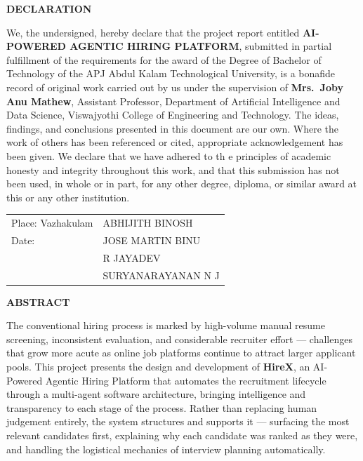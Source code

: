 \documentclass[12pt,a4paper]{report}
\begin{document}
\clearpage
\pagestyle{empty}
\begin{center}
    {\large\bfseries DECLARATION}
\end{center}
\vspace{0.5cm}

\noindent
We, the undersigned, hereby declare that the project report entitled \textbf{AI-POWERED AGENTIC HIRING PLATFORM}, submitted in partial fulfillment of the requirements for the award of the Degree of Bachelor of Technology of the APJ Abdul Kalam Technological University, is a bonafide record of original work carried out by us under the supervision of \textbf{Mrs.\ Joby Anu Mathew}, Assistant Professor, Department of Artificial Intelligence and Data Science, Viswajyothi College of Engineering and Technology. The ideas, findings, and conclusions presented in this document are our own. Where the work of others has been referenced or cited, appropriate acknowledgement has been given. We declare that we have adhered to th
e principles of academic honesty and integrity throughout this work, and that this submission has not been used, in whole or in part, for any other degree, diploma, or similar award at this or any other institution.

\vspace{1.5cm}

\noindent
\begin{tabular}{>{\raggedright\arraybackslash}p{} >{\raggedleft\arraybackslash}p{}}
    Place: Vazhakulam & ABHIJITH BINOSH \\[0.5cm]
    Date: \underline{\hspace{3cm}} & JOSE MARTIN BINU \\[0.5cm]
     & R JAYADEV \\[0.5cm]
     & SURYANARAYANAN N J \\
\end{tabular}
\clearpage

\clearpage
\pagestyle{empty}
\begin{center}
    {\large\bfseries ABSTRACT}
\end{center}
\vspace{0.5cm}

\noindent
The conventional hiring process is marked by high-volume manual resume screening, inconsistent evaluation, and considerable recruiter effort — challenges that grow more acute as online job platforms continue to attract larger applicant pools. This project presents the design and development of \textbf{HireX}, an AI-Powered Agentic Hiring Platform that automates the recruitment lifecycle through a multi-agent software architecture, bringing intelligence and transparency to each stage of the process. Rather than replacing human judgement entirely, the system structures and supports it — surfacing the most relevant candidates first, explaining why each candidate was ranked as they were, and handling the logistical mechanics of interview planning automatically.
\end{document}
